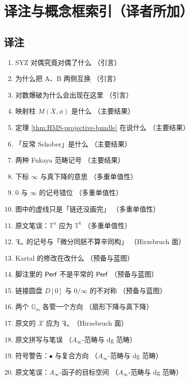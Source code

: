 \section{译注与概念框索引（译者所加）}
\subsection*{译注}
\begin{enumerate}[label={译注 \arabic*：},leftmargin=2.8cm,itemsep=1pt]
\item SYZ 对偶究竟对偶了什么 \quad（引言）
\item 为什么把 A、B 两侧互换 \quad（引言）
\item 对数爆破为什么会出现在这里 \quad（引言）
\item 映射柱 $M(X,\phi)$ 是什么 \quad（主要结果）
\item 定理 \ref{thm:HMS-projective-bundle} 在说什么 \quad（主要结果）
\item 「反常 Schober」是什么 \quad（主要结果）
\item 两种 Fukaya 范畴记号 \quad（主要结果）
\item 下标 $\infty$ 与真下降的意思 \quad（多重单值性）
\item $0$ 与 $\infty$ 的记号错位 \quad（多重单值性）
\item 图中的虚线只是「链还没画完」 \quad（多重单值性）
\item 原文笔误：$\mathbb{T}^n$ 应为 $\mathbb{T}^k$ \quad（多重单值性）
\item $\rF_n$ 的记号与「微分同胚不算辛同构」 \quad（Hirzebruch 面）
\item Kartal 的修改在改什么 \quad（预备与蓝图）
\item 脚注里的 $\operatorname{\mathsf{Perf}}$ 不是平常的 $\operatorname{\mathsf{Perf}}$ \quad（预备与蓝图）
\item 链接圆盘 ${D[0]}$ 与 $0/\infty$ 的不对称 \quad（预备与蓝图）
\item 两个 $\mathbb{G}_m$ 各管一个方向 \quad（扇形下降与真下降）
\item 原文的 $\mathcal{X}$ 应为 $\rF_n$ \quad（Hirzebruch 面）
\item 原文拼写与笔误 \quad（$A_{\infty}$-范畴与 dg 范畴）
\item 符号警告：$\bullet$ 与复合方向 \quad（$A_{\infty}$-范畴与 dg 范畴）
\item 原文笔误：$A_{\infty}$-函子的目标空间 \quad（$A_{\infty}$-范畴与 dg 范畴）

\end{enumerate}
